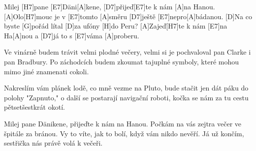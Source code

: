 
\sloka
[A]Milej [H7]pane [E7]Däni[A]kene, [D7]přijeď[E7]te k nám [A]na Hanou.
[A]Olo[H7]mouc je v [E7]tomto [A]směru [D7]ještě [E7]nepro[A]bádanou.
[D]Na co byste [G]pořád lítal [D]za ufóny [H]do Peru?
[A]Zajeď[H7]te k nám [E7]na Ha[A]nou a [D7]já to s [E7]váma [A]proberu.
        
\sloka
Ve vinárně budem trávit velmi plodné večery,
velmi si je pochvaloval pan Clarke i pan Bradbury.
Po záchodcích budem zkoumat tajuplné symboly,
které mohou mimo jiné znamenati cokoli.

\sloka
Nakreslím vám plánek lodě, co mně vezme na Pluto,
bude stačit jen dát páku do polohy "Zapnuto,"
o další se postarají navigační roboti,
kočka se nám za tu cestu pětsetšestkrát okotí.

\sloka
Milej pane Dänikene, přijeďte k nám na Hanou.
Počkám na vás zejtra večer ve špitále za bránou.
Vy to víte, jak to bolí, když vám nikdo nevěří.
Já už končím, sestřička nás právě volá k večeři.
